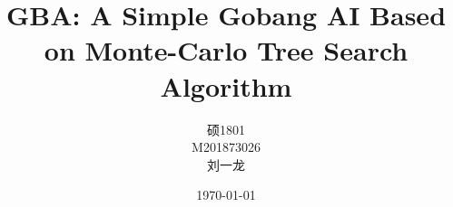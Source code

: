 

\documentclass[UTF8]{ctexart}
\usepackage{amsmath,amssymb,fancyhdr,url}
\usepackage[super,square,comma,sort]{natbib} %
\usepackage{graphicx}

\usepackage{hyperref}
\hypersetup{
  colorlinks,
  citecolor=black,
  filecolor=black,
  linkcolor=black,
  urlcolor=black
}

\usepackage{tocloft}
\renewcommand\cftsecfont{\normalfont}
\renewcommand\cftsecpagefont{\normalfont}
\renewcommand{\cftsecleader}{\cftdotfill{\cftsecdotsep}}
\renewcommand\cftsecdotsep{\cftdot}
\renewcommand\cftsubsecdotsep{\cftdot}
\renewcommand{\contentsname}{\hfill\bfseries\Large 目录\hfill}   
\setlength{\cftbeforesecskip}{10pt}

 
\title{GBA: A Simple Gobang AI Based on Monte-Carlo Tree Search Algorithm}
\author{硕1801\\ M201873026\\ 刘一龙}
\date{\today}


\usepackage{fancyhdr}
\setlength{\headheight}{15.2pt}
\pagestyle{fancy}
\rhead{\leftmark}
\cfoot{\thepage}




\maketitle
\newpage

\null\thispagestyle{empty}
\newpage


\tableofcontents
\newpage

\null\thispagestyle{empty}
\newpage


\section*{摘要}
Monte-Carlo tree search algorithm\cite{DBLP:conf/ecml/KocsisS06}\cite{DBLP:conf/aiide/ChaslotBSS08}
\newpage

